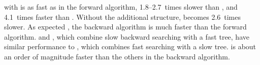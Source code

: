\RCST{} with \rselect{} is as fast as \CSTsada{} in the forward algorithm,
1.8\nobreakdash--2.7~times slower than \CSTnpr, and 4.1~times faster than \FCST. Without
the additional structure, \RCST{} becomes 2.6~times slower. As expected \cite{Ohlebusch2010a},
the backward algorithm is much faster than the forward algorithm. \CSTsada{} and \RCST,
which combine slow backward searching with a fast tree, have similar
performance to \FCST, which combines fast searching with a slow tree. \CSTnpr{} is about
an order of magnitude faster than the others in the backward algorithm.
